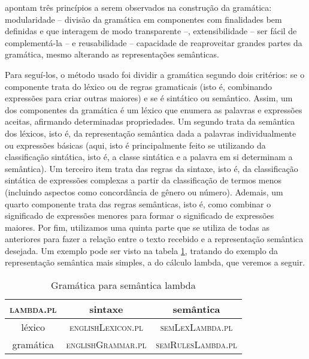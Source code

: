 	\citet[p.~86]{BlackburnBos:2005} apontam três princípios a serem observados na construção da gramática: modularidade -- divisão da gramática em componentes com finalidades bem definidas e que interagem de modo transparente --, extensibilidade -- ser fácil de complementá-la -- e reusabilidade -- capacidade de reaproveitar grandes partes da gramática, mesmo alterando as representações semânticas.
	
	Para seguí-los, o método usado foi dividir a gramática segundo dois critérios: se o componente trata do léxico ou de regras gramaticais (isto é, combinando expressões para criar outras maiores) e se é sintático ou semântico. Assim, um dos componentes da gramática é um léxico que enumera as palavras e expressões aceitas, afirmando determinadas propriedades. Um segundo trata da semântica dos léxicos, isto é, da representação semântica dada a palavras individualmente ou expressões básicas (aqui, isto é principalmente feito se utilizando da classificação sintática, isto é, a classe sintática e a palavra em si determinam a semântica). Um terceiro item trata das regras da sintaxe, isto é, da classificação sintática de expressões complexas a partir da classificação de termos menos (incluindo aspectos como concordância de gênero ou número). Ademais, um quarto componente trata das regras semânticas, isto é, como combinar o significado de expressões menores para formar o significado de expressões maiores. Por fim, utilizamos uma quinta parte que se utiliza de todas as anteriores para fazer a relação entre o texto recebido e a representação semântica desejada. Um exemplo pode ser visto na tabela \ref{curt-gramatica}, tratando do exemplo da representação semântica mais simples, a do cálculo lambda, que veremos a seguir.
	
	
	\begin{table}[h]
		\centering
		\begin{tabular}{|c|c|c|}
				\hline \textsc{lambda.pl} & sintaxe & semântica \\ 
				\hline léxico & \textsc{englishLexicon.pl} & \textsc{semLexLambda.pl} \\ 
				\hline gramática & \textsc{englishGrammar.pl} & \textsc{semRulesLambda.pl} \\ 
				\hline 
		\end{tabular}
		\caption{Gramática para semântica lambda}
		\label{curt-gramatica}
	\end{table}
		 
